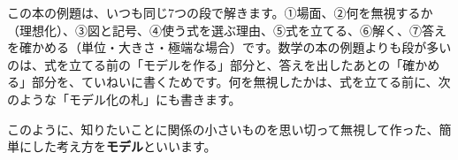 この本の例題は、いつも同じ7つの段で解きます。①場面、②何を無視するか（理想化）、③図と記号、④使う式を選ぶ理由、⑤式を立てる、⑥解く、⑦答えを確かめる（単位・大きさ・極端な場合）です。数学の本の例題よりも段が多いのは、式を立てる前の「モデルを作る」部分と、答えを出したあとの「確かめる」部分を、ていねいに書くためです。何を無視したかは、式を立てる前に、次のような「モデル化の札」にも書きます。
\begin{phmodel}
\end{phmodel}
このように、知りたいことに関係の小さいものを思い切って無視して作った、簡単にした考え方を\textbf{モデル}といいます。

